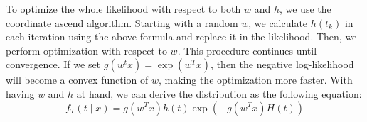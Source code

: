 \documentclass[]{article}
\begin{document}
To optimize the whole likelihood with respect to both $w$ and $h$, we use the coordinate ascend algorithm. Starting with a random $w$, we calculate $h(t_k)$ in each iteration using the above formula and replace it in the likelihood. Then, we perform optimization with respect to $w$. This procedure continues until convergence. If we set $g(w^tx)=\exp(w^Tx)$, then the negative log-likelihood will become a convex function of $w$, making the optimization more faster. With having $w$ and $h$ at hand, we can derive the distribution as the following equation:
\[f_T(t\mid x)=g(w^Tx)h(t)\exp(-g(w^Tx)H(t))\]
\printbibliography
\end{document}
